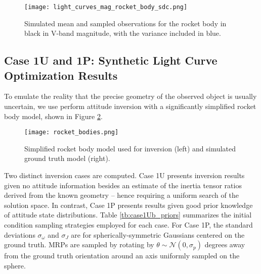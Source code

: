 \documentclass[a4paper,twocolumn]{spaceDebrisC} %
\newcommand{\figmed}[0]{0.35\textwidth}
\begin{document}
\begin{figure}[H]
  \centering
  \texttt{[image: light\_curves\_mag\_rocket\_body\_sdc.png]}
  \caption{Simulated mean and sampled observations for the rocket body in black in V-band magnitude, with the variance included in blue.}
  \label{fig:obs_mag_synth}
\end{figure}

\subsection{Case 1U and 1P: Synthetic Light Curve Optimization Results}

To emulate the reality that the precise geometry of the observed object is usually uncertain, we use perform attitude inversion with a significantly simplified rocket body model, shown in Figure \ref{fig:rb_models}.

\begin{figure}[H]
  \centering
  \texttt{[image: rocket\_bodies.png]}
  \caption{Simplified rocket body model used for inversion (left) and simulated ground truth model (right).}
  \label{fig:rb_models}
\end{figure}

Two distinct inversion cases are computed. Case 1U presents inversion results given no attitude information besides an estimate of the inertia tensor ratios derived from the known geometry -- hence requiring a uniform search of the solution space. In contrast, Case 1P presents results given good prior knowledge of attitude state distributions. Table \ref{tb:case1Ub_priors} summarizes the initial condition sampling strategies employed for each case. For Case 1P, the standard deviations $\sigma_\omega$ and $\sigma_J$ are for spherically-symmetric Gaussians centered on the ground truth. MRPs are sampled by rotating by $\theta\sim \mathcal{N}(0,\sigma_p)$ degrees away from the ground truth orientation around an axis uniformly sampled on the sphere.
\end{document}
